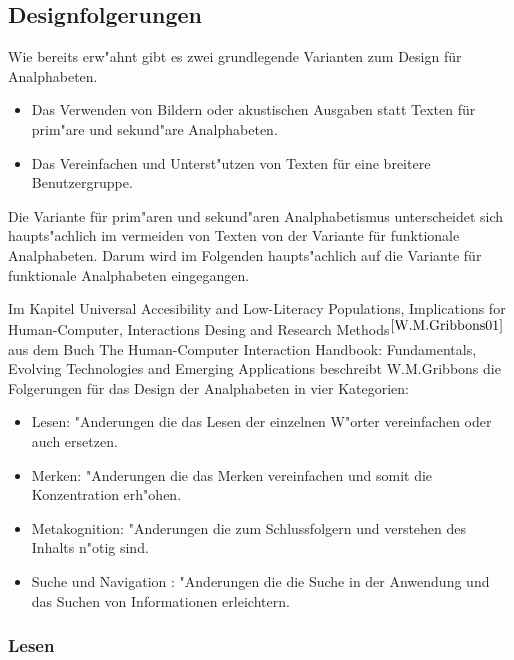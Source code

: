 \subsection{ Designfolgerungen}\label{sec:designClue}
Wie bereits erw"ahnt gibt es zwei grundlegende Varianten zum Design für Analphabeten.
\begin{itemize}
\item Das Verwenden von Bildern oder akustischen Ausgaben statt Texten für prim"are und sekund"are Analphabeten.
\item Das Vereinfachen und Unterst"utzen von Texten für eine breitere Benutzergruppe.
\end{itemize}
Die Variante für prim"aren und sekund"aren Analphabetismus unterscheidet sich haupts"achlich im vermeiden von Texten von der Variante für funktionale Analphabeten. Darum wird im Folgenden haupts"achlich auf die Variante für funktionale Analphabeten eingegangen.

Im Kapitel \glqq Universal Accesibility and Low-Literacy Populations, Implications for Human-Computer, Interactions Desing and Research Methods\grqq{}$^{\ref{W.M.Gribbons01}}$ aus dem Buch \glqq The Human-Computer Interaction Handbook: Fundamentals, Evolving Technologies and Emerging Applications\grqq{} beschreibt W.M.Gribbons die Folgerungen für das Design der Analphabeten in vier Kategorien:\\

\begin{itemize}
\item Lesen:              "Anderungen die das Lesen der einzelnen W"orter vereinfachen oder auch ersetzen.
\item Merken:            "Anderungen die das Merken vereinfachen und somit die Konzentration erh"ohen.
\item Metakognition: "Anderungen die zum Schlussfolgern und verstehen des Inhalts n"otig sind.
\item Suche und Navigation : "Anderungen die die Suche in der Anwendung und das Suchen von Informationen erleichtern.
\end{itemize}

\subsubsection{Lesen}\label{sec:designClueReading}


